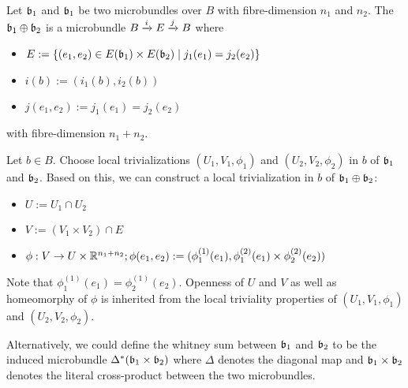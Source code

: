 \begin{mydefinition}
    Let $\bb_1$ and $\bb_1$ be two microbundles over $B$ with fibre-dimension $n_1$ and $n_2$.
    The  $\bb_1 \oplus \bb_2$ is a microbundle $\bundle{B}{E}{i}{j}$ where
    \begin{itemize}
        \item $E := \{ (e_1, e_2) \in E(\bb_1) \times E(\bb_2) \mid j_1(e_1) = j_2(e_2)\}$
        \item $i(b) := (i_1(b), i_2(b))$
        \item $j(e_1, e_2) := j_1(e_1) = j_2(e_2)$
    \end{itemize}
    with fibre-dimension $n_1 + n_2$.
\end{mydefinition}
\begin{myproof}
    Let $b \in B$.
    Choose local trivializations $(U_1, V_1, \phi_1)$ and $(U_2, V_2, \phi_2)$ in $b$ of $\bb_1$ and $\bb_2$.
    Based on this, we can construct a local trivialization in $b$ of $\bb_1 \oplus \bb_2$:
    \begin{itemize}
        \item $U := U_1 \cap U_2$
        \item $V := (V_1 \times V_2) \cap E$
        \item $\phi: V \to U \times \R^{n_1 + n_2}; \phi(e_1, e_2) := (\phi_1^{(1)}(e_1), \phi_1^{(2)}(e_1) \times  \phi_2^{(2)}(e_2))$
    \end{itemize}
    Note that $\phi_1^{(1)}(e_1) = \phi_2^{(1)}(e_2)$.
    Openness of $U$ and $V$ as well as homeomorphy of $\phi$ is inherited from the local triviality properties of $(U_1, V_1, \phi_1)$ and $(U_2, V_2, \phi_2)$.
\end{myproof}

\begin{myremark}
    Alternatively, we could define the whitney sum between $\bb_1$ and $\bb_2$ to be the induced microbundle $\Delta^*(\bb_1 \times \bb_2)$
    where $\Delta$ denotes the diagonal map and $\bb_1 \times \bb_2$ denotes the literal cross-product between the two microbundles.
\end{myremark}